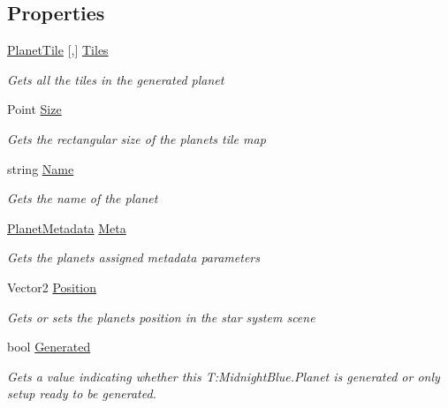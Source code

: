 \subsection*{Properties}
\begin{DoxyCompactItemize}
\item 
\hyperlink{class_midnight_blue_1_1_planet_tile}{Planet\+Tile} \mbox{[},\mbox{]} \hyperlink{class_midnight_blue_1_1_planet_a3e78bf28456cdfd2576b68e3ef106fc7}{Tiles}
\begin{DoxyCompactList}\small\item\em Gets all the tiles in the generated planet \end{DoxyCompactList}\item 
Point \hyperlink{class_midnight_blue_1_1_planet_a10c69ed4de9c28b2e61848e3bb89c377}{Size}
\begin{DoxyCompactList}\small\item\em Gets the rectangular size of the planets tile map \end{DoxyCompactList}\item 
string \hyperlink{class_midnight_blue_1_1_planet_aafbf18faf5aea56097d4f20d6b166d8a}{Name}
\begin{DoxyCompactList}\small\item\em Gets the name of the planet \end{DoxyCompactList}\item 
\hyperlink{class_midnight_blue_1_1_planet_metadata}{Planet\+Metadata} \hyperlink{class_midnight_blue_1_1_planet_a064b1e2b9aa83abac4065f4a7e0c5e58}{Meta}
\begin{DoxyCompactList}\small\item\em Gets the planets assigned metadata parameters \end{DoxyCompactList}\item 
Vector2 \hyperlink{class_midnight_blue_1_1_planet_a1ca1fc407e47136abb5b633e11cb8d51}{Position}
\begin{DoxyCompactList}\small\item\em Gets or sets the planets position in the star system scene \end{DoxyCompactList}\item 
bool \hyperlink{class_midnight_blue_1_1_planet_a525e5089a0a522069f10302d9ece26e1}{Generated}
\begin{DoxyCompactList}\small\item\em Gets a value indicating whether this T\+:\+Midnight\+Blue.\+Planet is generated or only setup ready to be generated. \end{DoxyCompactList}\end{DoxyCompactItemize}


